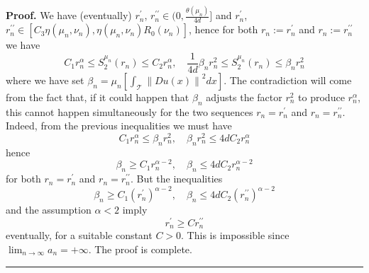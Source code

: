 \documentclass[11pt]{preprint}
\newenvironment{proof}[1][Proof]{\textbf{#1.} }{\ \rule{0.5em}{0.5em}}
\begin{document}
\begin{proof}
We have (eventually) $r_{n}^{\prime}$, $r_{n}^{\prime\prime}\in(0,\frac
{\theta\left(  \mu_{n}\right)  }{4d}]$ and $r_{n}^{\prime}$, $r_{n}%
^{\prime\prime}\in\left[  C_{3}\eta\left(  \mu_{n},\nu_{n}\right)
,\eta\left(  \mu_{n},\nu_{n}\right)  R_{0}\left(  \nu_{n}\right)  \right]  $,
hence for both $r_{n}:=r_{n}^{\prime}$ and $r_{n}:=r_{n}^{\prime\prime}$ we
have
\[
C_{1}r_{n}^{\alpha}\leq S_{2}^{\mu_{n}}\left(  r_{n}\right)  \leq C_{2}%
r_{n}^{\alpha},\quad\frac{1}{4d}\beta_{n}r_{n}^{2}\leq S_{2}^{\mu_{n}}\left(
r_{n}\right)  \leq\beta_{n}r_{n}^{2}%
\]
where we have set $\beta_{n}=\mu_{n}\left[  \int_{\mathcal{T}}\left\|
Du\left(  x\right)  \right\|  ^{2}dx\right]  $. The contradiction will come
from the fact that, if it could happen that $\beta_{n}$ adjusts the factor
$r_{n}^{2}$ to produce $r_{n}^{\alpha}$, this cannot happen simultaneously for
the two sequences $r_{n}=r_{n}^{\prime}$ and $r_{n}=r_{n}^{\prime\prime}$.
Indeed, from the previous inequalities we must have
\[
C_{1}r_{n}^{\alpha}\leq\beta_{n}r_{n}^{2},\quad\beta_{n}r_{n}^{2}\leq
4dC_{2}r_{n}^{\alpha}%
\]
hence
\[
\beta_{n}\geq C_{1}r_{n}^{\alpha-2},\quad\beta_{n}\leq4dC_{2}r_{n}^{\alpha-2}%
\]
for both $r_{n}=r_{n}^{\prime}$ and $r_{n}=r_{n}^{\prime\prime}$. But the
inequalities
\[
\beta_{n}\geq C_{1}\left(  r_{n}^{\prime}\right)  ^{\alpha-2},\quad\beta
_{n}\leq4dC_{2}\left(  r_{n}^{\prime\prime}\right)  ^{\alpha-2}%
\]
and the assumption $\alpha<2$ imply
\[
r_{n}^{\prime}\geq Cr_{n}^{\prime\prime}%
\]
eventually, for a suitable constant $C>0$. This is impossible since
$\lim_{n\rightarrow\infty}a_{n}=+\infty$. The proof is complete.
\end{proof}
\end{document}
